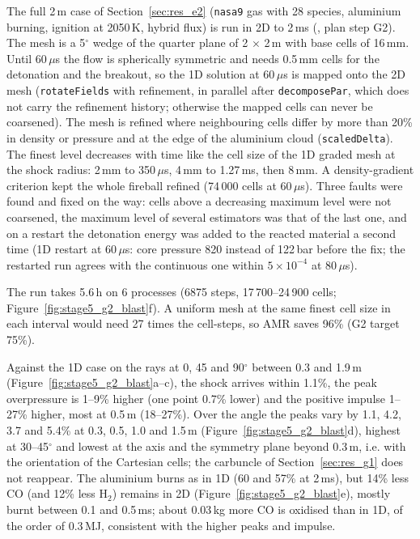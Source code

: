 \documentclass{article}
\begin{document}
The full 2\,m case of Section~\ref{sec:res_e2} (\texttt{nasa9} gas with 28 species, aluminium burning, ignition at 2050\,K, hybrid flux) is run in 2D to 2\,ms (, plan step G2). The mesh is a 5$^\circ$ wedge of the quarter plane of 2 $\times$ 2\,m with base cells of 16\,mm. Until 60\,$\mu$s the flow is spherically symmetric and needs 0.5\,mm cells for the detonation and the breakout, so the 1D solution at 60\,$\mu$s is mapped onto the 2D mesh (\texttt{rotateFields} with refinement, in parallel after \texttt{decomposePar}, which does not carry the refinement history; otherwise the mapped cells can never be coarsened). The mesh is refined where neighbouring cells differ by more than 20\% in density or pressure and at the edge of the aluminium cloud (\texttt{scaledDelta}). The finest level decreases with time like the cell size of the 1D graded mesh at the shock radius: 2\,mm to 350\,$\mu$s, 4\,mm to 1.27\,ms, then 8\,mm. A density-gradient criterion kept the whole fireball refined (74\,000 cells at 60\,$\mu$s). Three faults were found and fixed on the way: cells above a decreasing maximum level were not coarsened, the maximum level of several estimators was that of the last one, and on a restart the detonation energy was added to the reacted material a second time (1D restart at 60\,$\mu$s: core pressure 820 instead of 122\,bar before the fix; the restarted run agrees with the continuous one within $5\times10^{-4}$ at 80\,$\mu$s).

The run takes 5.6\,h on 6 processes (6875 steps, 17\,700--24\,900 cells; Figure~\ref{fig:stage5_g2_blast}f). A uniform mesh at the same finest cell size in each interval would need 27 times the cell-steps, so AMR saves 96\% (G2 target 75\%).

Against the 1D case on the rays at 0, 45 and 90$^\circ$ between 0.3 and 1.9\,m (Figure~\ref{fig:stage5_g2_blast}a--c), the shock arrives within 1.1\%, the peak overpressure is 1--9\% higher (one point 0.7\% lower) and the positive impulse 1--27\% higher, most at 0.5\,m (18--27\%). Over the angle the peaks vary by 1.1, 4.2, 3.7 and 5.4\% at 0.3, 0.5, 1.0 and 1.5\,m (Figure~\ref{fig:stage5_g2_blast}d), highest at 30--45$^\circ$ and lowest at the axis and the symmetry plane beyond 0.3\,m, i.e. with the orientation of the Cartesian cells; the carbuncle of Section~\ref{sec:res_g1} does not reappear. The aluminium burns as in 1D (60 and 57\% at 2\,ms), but 14\% less CO (and 12\% less H$_2$) remains in 2D (Figure~\ref{fig:stage5_g2_blast}e), mostly burnt between 0.1 and 0.5\,ms; about 0.03\,kg more CO is oxidised than in 1D, of the order of 0.3\,MJ, consistent with the higher peaks and impulse.
\end{document}
